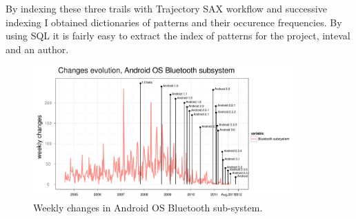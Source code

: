 \documentclass[a4paper,10pt]{article}
\numberwithin{equation}{subsection}
\begin{document}
By indexing these three trails with Trajectory SAX workflow and successive indexing I obtained
dictionaries of patterns and their occurence frequencies. By using SQL it is fairly easy
to extract the index of patterns for the project, inteval and an author.

\begin{figure}[htb]
  \centering
  \includegraphics[width=0.9\textwidth]{figures/bluetooth_changes.pdf}
  \caption{Weekly changes in Android OS Bluetooth sub-system.}
  \label{fig:bluetooth_changes}
\end{figure}
\end{document}

